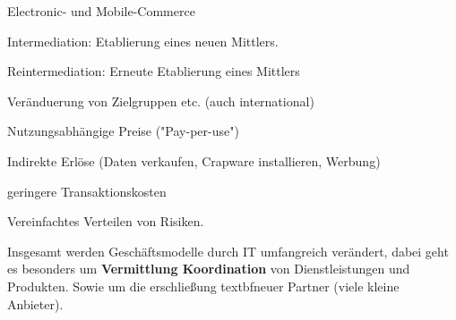 \begin{description}
    \item Electronic- und Mobile-Commerce

    \item Intermediation: Etablierung eines neuen Mittlers.

    \item Reintermediation: Erneute Etablierung eines Mittlers 

    \item[Kunden]

    \item Veränduerung von Zielgruppen etc. (auch international)

    \item[Erlösströme]

    \item Nutzungsabhängige Preise ("Pay-per-use")

    \item Indirekte Erlöse (Daten verkaufen, Crapware installieren, Werbung)

    \item[Kostenstrucktur]

    \item geringere Transaktionskosten

    \item Vereinfachtes Verteilen von Risiken.

\end{description}

Insgesamt werden Geschäftsmodelle durch IT umfangreich verändert, dabei geht es besonders um \textbf{Vermittlung Koordination} von Dienstleistungen und Produkten. Sowie um die erschließung textbf{neuer Partner} (viele kleine Anbieter).